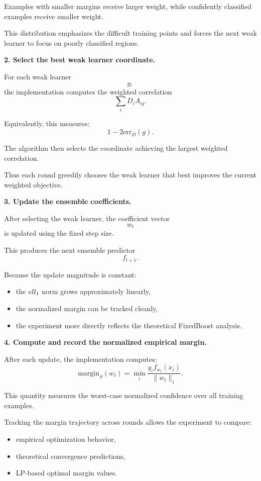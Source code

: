 \documentclass[11pt]{article}
\begin{document}
\begin{enumerate}
\begin{solutionbox}
Examples with smaller margins receive larger weight, while confidently classified examples receive smaller weight.

This distribution emphasizes the difficult training points and forces the next weak learner to focus on poorly classified regions.

\medskip

\textbf{2. Select the best weak learner coordinate.}

For each weak learner
\[
g,
\]
the implementation computes the weighted correlation
\[
\sum_iD_iA_{ig}.
\]

Equivalently, this measures:
\[
1-2\mathrm{err}_D(g).
\]

The algorithm then selects the coordinate achieving the largest weighted correlation.

Thus each round greedily chooses the weak learner that best improves the current weighted objective.

\medskip

\textbf{3. Update the ensemble coefficients.}

After selecting the weak learner,
the coefficient vector
\[
w_t
\]
is updated using the fixed step size.

This produces the next ensemble predictor
\[
f_{t+1}.
\]

Because the update magnitude is constant:
\begin{itemize}
    \item the $\\ell_1$ norm grows approximately linearly,
    \item the normalized margin can be tracked cleanly,
    \item the experiment more directly reflects the theoretical FixedBoost analysis.
\end{itemize}

\medskip

\textbf{4. Compute and record the normalized empirical margin.}

After each update, the implementation computes:
\[
\mathrm{margin}_S(w_t)
=
\min_i
\frac{
y_if_{w_t}(x_i)
}{
\|w_t\|_1
}.
\]

This quantity measures the worst-case normalized confidence over all training examples.

Tracking the margin trajectory across rounds allows the experiment to compare:
\begin{itemize}
    \item empirical optimization behavior,
    \item theoretical convergence predictions,
    \item LP-based optimal margin values.
\end{itemize}


\end{solutionbox}
\end{enumerate}
\end{document}
